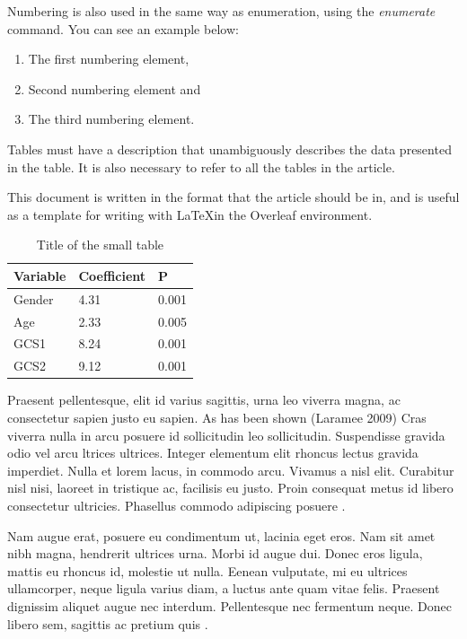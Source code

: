 \documentclass{comjnl}
\begin{document}
Numbering is also used in the same way as enumeration, using the \textit{enumerate} command. You can see an example below:

\begin{enumerate}
     \item The first numbering element,
     \item Second numbering element and
     \item The third numbering element.
\end{enumerate}

Tables must have a description that unambiguously describes the data presented in the table. It is also necessary to refer to all the tables in the article.

This document is written in the format that the article should be in, and is useful as a template for writing with \LaTeX in the Overleaf environment.

\begin{table}[t]
\caption{Title of the small table}
\label{tab:malatabela}
\begin{tabular}{|l|l|l|}
\hline
\rowcolor[HTML]{656565} 
{\color[HTML]{FFFFFF} Variable} & {\color[HTML]{FFFFFF} Coefficient} & {\color[HTML]{FFFFFF} P} \\ \hline
Gender & 4.31 & 0.001 \\ \hline
Age & 2.33 & 0.005 \\ \hline
GCS1 & 8.24 & 0.001 \\ \hline
GCS2 & 9.12 & 0.001 \\ \hline
\end{tabular}
\end{table}

Praesent pellentesque, elit id varius sagittis, urna leo viverra magna, ac consectetur sapien justo eu sapien. As has been shown (Laramee 2009) Cras viverra nulla in arcu posuere id sollicitudin leo sollicitudin. Suspendisse gravida odio vel arcu ltrices ultrices. Integer elementum elit rhoncus lectus gravida imperdiet. Nulla et lorem lacus, in commodo arcu. Vivamus a nisl elit. Curabitur nisl nisi, laoreet in tristique ac, facilisis eu justo. Proin consequat metus id libero consectetur ultricies. Phasellus commodo adipiscing posuere \cite{Figl2013}.

Nam augue erat, posuere eu condimentum ut, lacinia eget eros. Nam sit amet nibh magna, hendrerit ultrices urna. Morbi id augue dui. Donec eros ligula, mattis eu rhoncus id, molestie ut nulla. 
Eenean vulputate, mi eu ultrices ullamcorper, neque ligula varius diam, a luctus ante quam vitae felis. Praesent dignissim aliquet augue nec interdum. Pellentesque nec fermentum neque. Donec libero sem, sagittis ac pretium quis \cite{Genon2011}.
\end{document}
